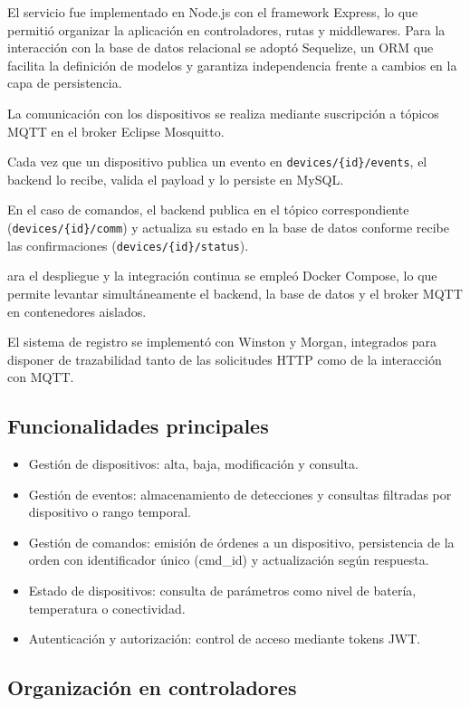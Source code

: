 El servicio fue implementado en Node.js con el framework Express, lo que permitió organizar la aplicación en controladores, rutas y middlewares. Para la interacción con la base de datos relacional se adoptó Sequelize, un ORM que facilita la definición de modelos y garantiza independencia frente a cambios en la capa de persistencia.

La comunicación con los dispositivos se realiza mediante suscripción a tópicos MQTT en el broker Eclipse Mosquitto. 

Cada vez que un dispositivo publica un evento en \texttt{devices/\{id\}/events}, 
el backend lo recibe, valida el payload y lo persiste en MySQL.
 
En el caso de comandos, el backend publica en el tópico correspondiente 
(\texttt{devices/\{id\}/comm}) y actualiza su estado en la base de datos 
conforme recibe las confirmaciones (\texttt{devices/\{id\}/status}).

ara el despliegue y la integración continua se empleó Docker Compose, lo que permite levantar simultáneamente el backend, la base de datos y el broker MQTT en contenedores aislados.

El sistema de registro se implementó con Winston y Morgan, integrados para disponer de trazabilidad tanto de las solicitudes HTTP como de la interacción con MQTT.


\subsection{Funcionalidades principales}

\begin{itemize}
    \item Gestión de dispositivos: alta, baja, modificación y consulta.
    \item Gestión de eventos: almacenamiento de detecciones y consultas filtradas por dispositivo o rango temporal.
    \item Gestión de comandos: emisión de órdenes a un dispositivo, persistencia de la orden con identificador único (cmd\_id) y actualización según respuesta.
    \item Estado de dispositivos: consulta de parámetros como nivel de batería, temperatura o conectividad.
    \item Autenticación y autorización: control de acceso mediante tokens JWT.
\end{itemize}


\subsection{Organización en controladores}

